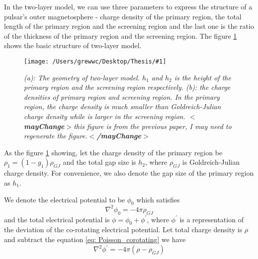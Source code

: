 \documentclass[12pt]{report}
\newcommand{\mycaption}[1]{\caption{\textit{\footnotesize #1}}}
\newcommand{\singleFig}[3]{
 \begin{figure}[!ht]
  \centering
  \texttt{[image: /Users/grewwc/Desktop/Thesis/\#1]}
  \mycaption{#3}
  \label{fig: #1}
 \end{figure} 
}
\newcommand{\mayChange}[1]{
  $<$\textbf{mayChange}$>$#1$<$\textbf{/mayChange}$>$
}
\newcommand{\myComment}[1]{
  \newline
}
\begin{document}
          In the two-layer model, we can use three parameters to express the structure of a pulsar's outer 
          magnetosphere - charge density of the primary region, the total length of the primary region and the 
          screening region and the last one is the ratio of the thickness of the primary region and the 
          screening region. The figure \ref{fig: charge_density} shows the basic structure of two-layer model. 

          \singleFig{charge_density}{0.6}{(a): The geometry of two-layer model. $h_{1}$ and $h_{2}$ is the height
          of the primary region and the screening region respectively. (b): the charge densities of primary region and 
          screening region. In the primary region, the charge density is much smaller than Goldreich-Julian charge density
          while is larger in the screening region. \mayChange{this figure is from the previous paper, I may need to 
          regenerate the figure.}}
      
          As the figure \ref{fig: charge_density} showing, 
          let the charge density of the primary region be $\rho_1 = (1-g_{1}) \rho_{GJ}$ and the total gap size is 
          $h_{2}$, where $\rho_{GJ}$ is Goldreich-Julian charge density. For convenience, 
          we also denote the gap size of the primary region as $h_{1}$. 
          \myComment{Then we can calculate electric potential and electric field by solving the Poisson equation }

          We denote the electrical potential to be $\phi_{0}$ which satisfies 
          \begin{equation}
            \label{eq: Poisson_corotating}
            \nabla^{2}\phi_{0} = -4\pi\rho_{GJ}
          \end{equation}
          and the total electrical potential is $\phi = \phi_{0} + \phi^{\prime}$, where $\phi^{\prime}$ is a 
          representation of the deviation of the co-rotating electrical potential.  
          Let total charge density is $\rho$ and subtract the equation \ref{eq: Poisson_corotating} we have 
          \begin{equation}
            \label{eq: Poisson_final}
            \nabla^{2}\phi^{\prime} = -4\pi\left(\rho - \rho_{GJ} \right)
          \end{equation}
\end{document}
